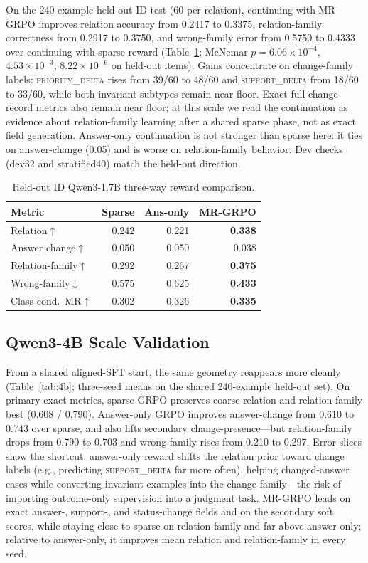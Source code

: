 \documentclass[letterpaper]{article}
\newcommand{\method}{MR-GRPO}
\newcommand{\lab}[1]{\textsc{#1}}
\begin{document}
On the 240-example held-out ID test (60 per relation), continuing with \method{} improves relation accuracy from 0.2417 to 0.3375, relation-family correctness from 0.2917 to 0.3750, and wrong-family error from 0.5750 to 0.4333 over continuing with sparse reward (Table~\ref{tab:1p7b}; McNemar $p=6.06\times10^{-4}$, $4.53\times10^{-3}$, $8.22\times10^{-6}$ on held-out items). Gains concentrate on change-family labels: \lab{priority\_delta} rises from 39/60 to 48/60 and \lab{support\_delta} from 18/60 to 33/60, while both invariant subtypes remain near floor. Exact full change-record metrics also remain near floor; at this scale we read the continuation as evidence about relation-family learning after a shared sparse phase, not as exact field generation. Answer-only continuation is not stronger than sparse here: it ties on answer-change (0.05) and is worse on relation-family behavior. Dev checks (dev32 and stratified40) match the held-out direction.

\begin{table}[t]
\centering
\small
\begin{tabular}{lrrr}
\toprule
Metric & Sparse & Ans-only & \method{} \\
\midrule
Relation$\uparrow$ & 0.242 & 0.221 & \textbf{0.338} \\
Answer change$\uparrow$ & 0.050 & 0.050 & 0.038 \\
Relation-family$\uparrow$ & 0.292 & 0.267 & \textbf{0.375} \\
Wrong-family$\downarrow$ & 0.575 & 0.625 & \textbf{0.433} \\
Class-cond.\ MR$\uparrow$ & 0.302 & 0.326 & \textbf{0.335} \\
\bottomrule
\end{tabular}
\caption{Held-out ID Qwen3-1.7B three-way reward comparison.}
\label{tab:1p7b}
\end{table}

\subsection{Qwen3-4B Scale Validation}

From a shared aligned-SFT start, the same geometry reappears more cleanly (Table~\ref{tab:4b}; three-seed means on the shared 240-example held-out set). On primary exact metrics, sparse GRPO preserves coarse relation and relation-family best (0.608 / 0.790). Answer-only GRPO improves answer-change from 0.610 to 0.743 over sparse, and also lifts secondary change-presence---but relation-family drops from 0.790 to 0.703 and wrong-family rises from 0.210 to 0.297. Error slices show the shortcut: answer-only reward shifts the relation prior toward change labels (e.g., predicting \lab{support\_delta} far more often), helping changed-answer cases while converting invariant examples into the change family---the risk of importing outcome-only supervision into a judgment task. \method{} leads on exact answer-, support-, and status-change fields and on the secondary soft scores, while staying close to sparse on relation-family and far above answer-only; relative to answer-only, it improves mean relation and relation-family in every seed.
\end{document}
